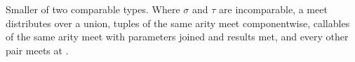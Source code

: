 Smaller of two comparable types. Where $\sigma$ and $\tau$ are incomparable, a meet distributes over a
union, tuples of the same arity meet componentwise, callables of the same arity meet with parameters
joined and results met, and every other pair meets at .
